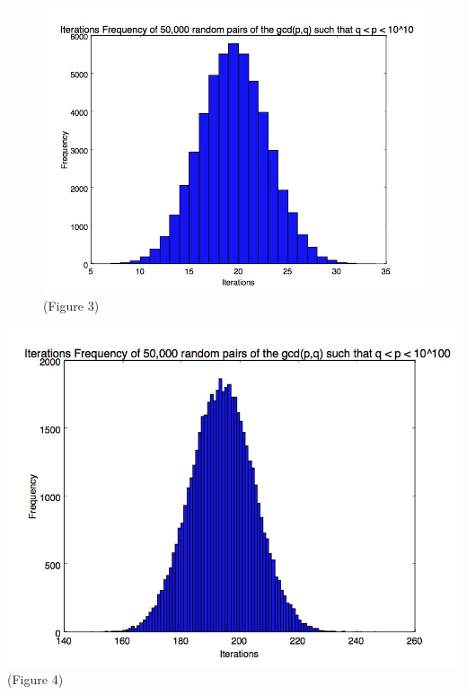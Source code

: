 \documentclass{beamer}
\begin{document}
\begin{frame}
\begin{figure}
		
		\center \includegraphics[scale=.3]{10_digit_numbers.jpg}
		\center \tiny(Figure 3)
\end{figure}

\end{frame}

\begin{frame}
		\center \includegraphics[scale=.3]{100_digit_numbers_freq.jpg}
		\center \tiny(Figure 4)

\end{frame}
\end{document}

